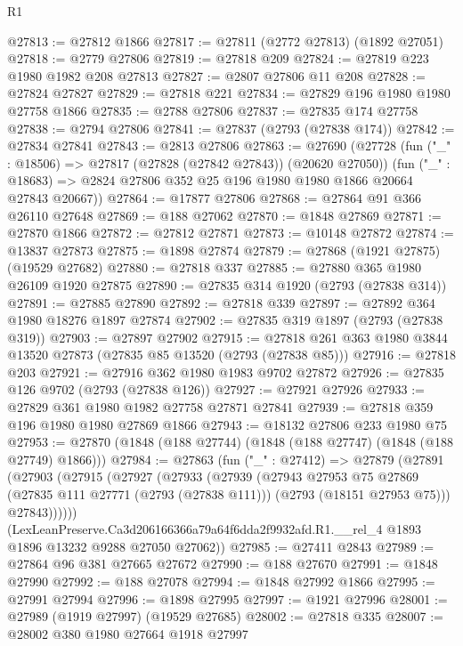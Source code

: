 \begin{lexlean}{R1}
\begin{coremodule}
@27813 := @27812 @1866
@27817 := @27811 (@2772 @27813) (@1892 @27051)
@27818 := @2779 @27806
@27819 := @27818 @209
@27824 := @27819 @223 @1980 @1982 @208 @27813
@27827 := @2807 @27806 @11 @208
@27828 := @27824 @27827
@27829 := @27818 @221
@27834 := @27829 @196 @1980 @1980 @27758 @1866
@27835 := @2788 @27806
@27837 := @27835 @174 @27758
@27838 := @2794 @27806
@27841 := @27837 (@2793 (@27838 @174))
@27842 := @27834 @27841
@27843 := @2813 @27806
@27863 := @27690
    (@27728
      (fun ("_" : @18506) => @27817 (@27828 (@27842 @27843)) (@20620 @27050))
      (fun ("_" : @18683) => @2824 @27806 @352 @25 @196 @1980 @1980 @1866 @20664 @27843 @20667))
@27864 := @17877 @27806
@27868 := @27864 @91 @366 @26110 @27648
@27869 := @188 @27062
@27870 := @1848 @27869
@27871 := @27870 @1866
@27872 := @27812 @27871
@27873 := @10148 @27872
@27874 := @13837 @27873
@27875 := @1898 @27874
@27879 := @27868 (@1921 @27875) (@19529 @27682)
@27880 := @27818 @337
@27885 := @27880 @365 @1980 @26109 @1920 @27875
@27890 := @27835 @314 @1920 (@2793 (@27838 @314))
@27891 := @27885 @27890
@27892 := @27818 @339
@27897 := @27892 @364 @1980 @18276 @1897 @27874
@27902 := @27835 @319 @1897 (@2793 (@27838 @319))
@27903 := @27897 @27902
@27915 := @27818 @261 @363 @1980 @3844 @13520 @27873 (@27835 @85 @13520 (@2793 (@27838 @85)))
@27916 := @27818 @203
@27921 := @27916 @362 @1980 @1983 @9702 @27872
@27926 := @27835 @126 @9702 (@2793 (@27838 @126))
@27927 := @27921 @27926
@27933 := @27829 @361 @1980 @1982 @27758 @27871 @27841
@27939 := @27818 @359 @196 @1980 @1980 @27869 @1866
@27943 := @18132 @27806 @233 @1980 @75
@27953 := @27870 (@1848 (@188 @27744) (@1848 (@188 @27747) (@1848 (@188 @27749) @1866)))
@27984 := @27863
    (fun ("_" : @27412) =>
    @27879
      (@27891
        (@27903
          (@27915
            (@27927
              (@27933
                (@27939
                  (@27943
                    @27953
                    @75
                    @27869
                    (@27835 @111 @27771 (@2793 (@27838 @111)))
                    (@2793 (@18151 @27953 @75)))
                  @27843))))))
      (LexLeanPreserve.Ca3d206166366a79a64f6dda2f9932afd.R1.__rel_4
        @1893
        @1896
        @13232
        @9288
        @27050
        @27062))
@27985 := @27411 @2843
@27989 := @27864 @96 @381 @27665 @27672
@27990 := @188 @27670
@27991 := @1848 @27990
@27992 := @188 @27078
@27994 := @1848 @27992 @1866
@27995 := @27991 @27994
@27996 := @1898 @27995
@27997 := @1921 @27996
@28001 := @27989 (@1919 @27997) (@19529 @27685)
@28002 := @27818 @335
@28007 := @28002 @380 @1980 @27664 @1918 @27997

\end{coremodule}
\end{lexlean}

